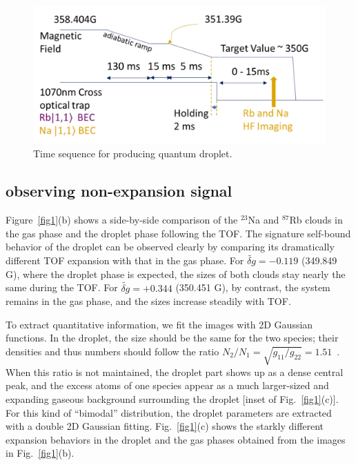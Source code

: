 \begin{figure}[hbt]
\begin{center}
\includegraphics[width = 0.8\linewidth]{figures/droplet_time_sequence.pdf}
\end{center}
\caption[Time sequence for producing quantum droplet]{Time sequence for producing quantum droplet.}
\label{droplet_time_sequence}
\end{figure}

\subsection{observing non-expansion signal}

Figure~\ref{fig1}(b) shows a side-by-side comparison of the $^{23}$Na and $^{87}$Rb clouds in the gas phase and the droplet phase following the TOF. The signature self-bound behavior of the droplet can be observed clearly by comparing its dramatically different TOF expansion with that in the gas phase. For $\widetilde{\delta g}=-0.119$ (349.849 G), where the droplet phase is expected, the sizes of both clouds stay nearly the same during the TOF. For $\widetilde{\delta g}=+0.344$ (350.451 G), by contrast, the system remains in the gas phase, and the sizes increase steadily with TOF.

To extract quantitative information, we fit the images with 2D Gaussian functions. In the droplet, the size should be the same for the two species; their densities and thus numbers should follow the ratio $N_{2}/N_{1} = \sqrt{g_{11}/g_{22}}=1.51$~\cite{petrov2015}. When this ratio is not maintained, the droplet part shows up as a dense central peak, and the excess atoms of one species appear as a much larger-sized and expanding gaseous background surrounding the droplet [inset of Fig.~\ref{fig1}(c)]. For this kind of ``bimodal'' distribution, the droplet parameters are extracted with a double 2D Gaussian fitting. Fig.~\ref{fig1}(c) shows the starkly different expansion behaviors in the droplet and the gas phases obtained from the images in Fig.~\ref{fig1}(b).


